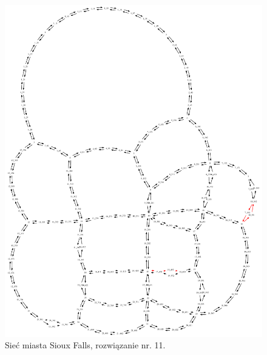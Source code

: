 \documentclass[twoside,12pt]{report}
\begin{document}
\begin{figure}[ht]
\centering
\includegraphics[totalheight=0.580\textheight, angle=90]{img/sioux-out/11/network2}
\caption{Sieć miasta Sioux Falls, rozwiązanie nr. 11.}
\label{sioux11}
\end{figure}
\end{document}

